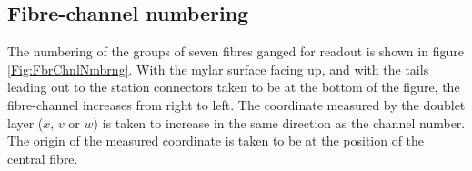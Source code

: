
\subsection{Fibre-channel numbering}
\label{SubSect:FbrNmbrng}

The numbering of the groups of seven fibres ganged for readout is shown in figure \ref{Fig:FbrChnlNmbrng}. With the mylar surface facing up, and with the tails leading out to the station connectors taken to be at the bottom of the figure, the fibre-channel increases from right to left. The coordinate measured by the doublet layer ($x$, $v$ or $w$) is taken to increase in the same direction as the channel number. The origin of the measured coordinate is taken to be at the position of the central fibre.

